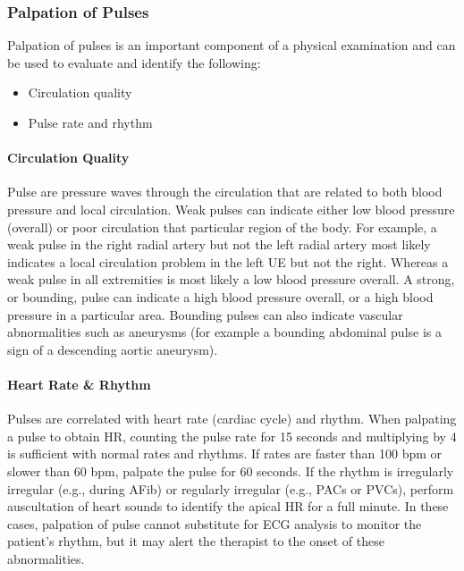 \subsubsection{Palpation of Pulses} 
Palpation of pulses is an important component of a physical examination and can be used to evaluate and identify the following:

\begin{itemize}
\item Circulation quality
\item Pulse rate and rhythm
\end{itemize}

\paragraph{Circulation Quality}

Pulse are pressure waves through the circulation that are related to both blood pressure and local circulation. Weak pulses can indicate either low blood pressure (overall) or poor circulation that particular region of the body. For example, a weak pulse in the right radial artery but not the left radial artery most likely indicates a local circulation problem in the left UE but not the right. Whereas a weak pulse in all extremities is most likely a low blood pressure overall. A strong, or bounding, pulse can indicate a high blood pressure overall, or a high blood pressure in a particular area. Bounding pulses can also indicate vascular abnormalities such as aneurysms (for example a bounding abdominal pulse is a sign of a descending aortic aneurysm).

\paragraph{Heart Rate \& Rhythm}

Pulses are correlated with heart rate (cardiac cycle) and rhythm. When palpating a pulse to obtain HR, counting the pulse rate for 15 seconds and multiplying by 4 is sufficient with normal rates and rhythms. If rates are faster than 100 bpm or slower than 60 bpm, palpate the pulse for 60 seconds. If the rhythm is irregularly irregular (e.g., during AFib) or regularly irregular (e.g., PACs or PVCs), perform auscultation of heart sounds to identify the apical HR for a full minute. In these cases, palpation of pulse cannot substitute for ECG analysis to monitor the patient’s rhythm, but it may alert the therapist to the onset of these abnormalities.

